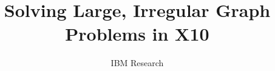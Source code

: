 \documentclass[onecolumn,12pt]{ieee}
\numberwithin{equation}{section}
\begin{document}
\title{Solving Large, Irregular Graph Problems in X10}

\author{IBM Research}

\maketitle
\thispagestyle{empty}













\end{document}
